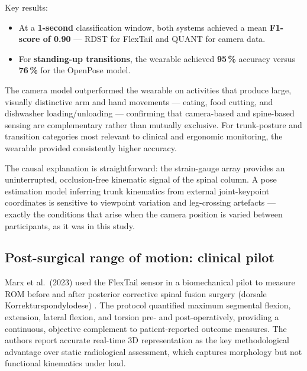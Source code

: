 Key results:

\begin{itemize}
	\item At a \textbf{1-second} classification window, both systems achieved a mean
	      \textbf{F1-score of 0.90} --- RDST for FlexTail and QUANT for camera data.
	\item For \textbf{standing-up transitions}, the wearable achieved \textbf{95\,\%}
	      accuracy versus \textbf{76\,\%} for the OpenPose model.
\end{itemize}

The camera model outperformed the wearable on activities that produce large, visually
distinctive arm and hand movements --- eating, food cutting, and dishwasher
loading/unloading --- confirming that camera-based and spine-based sensing are
complementary rather than mutually exclusive.
For trunk-posture and transition categories most relevant to clinical and ergonomic
monitoring, the wearable provided consistently higher accuracy.

The causal explanation is straightforward: the strain-gauge array provides an
uninterrupted, occlusion-free kinematic signal of the spinal column.
A pose estimation model inferring trunk kinematics from external joint-keypoint
coordinates is sensitive to viewpoint variation and leg-crossing artefacts --- exactly
the conditions that arise when the camera position is varied between participants, as
it was in this study.

\subsection{Post-surgical range of motion: clinical pilot}

Marx et al.\ (2023) used the FlexTail sensor in a biomechanical pilot to measure \ac{ROM}
before and after posterior corrective spinal fusion surgery (dorsale
Korrekturspondylodese) \cite{marx2023}.
The protocol quantified maximum segmental flexion, extension, lateral flexion, and
torsion pre- and post-operatively, providing a continuous, objective complement to
patient-reported outcome measures.
The authors report accurate real-time 3D representation as the key methodological
advantage over static radiological assessment, which captures morphology but not
functional kinematics under load.
